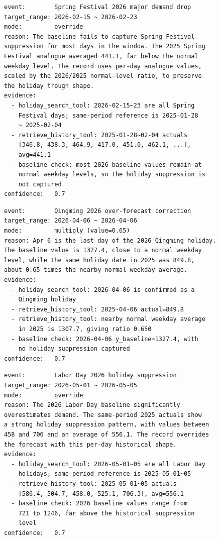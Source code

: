 \documentclass{article}
\theoremstyle{plain}
\theoremstyle{definition}
\theoremstyle{remark}
\begin{document}
\begin{lstlisting}[caption={Long-horizon revision: Spring Festival}, label={lst:case_study_6_3_spring_festival}]
event:        Spring Festival 2026 major demand drop
target_range: 2026-02-15 ~ 2026-02-23
mode:         override
reason: The baseline fails to capture Spring Festival
suppression for most days in the window. The 2025 Spring
Festival analogue averaged 441.1, far below the normal
weekday level. The record uses per-day analogue values,
scaled by the 2026/2025 normal-level ratio, to preserve
the holiday trough shape.
evidence:
  - holiday_search_tool: 2026-02-15~23 are all Spring
    Festival days; same-period reference is 2025-01-28
    ~ 2025-02-04
  - retrieve_history_tool: 2025-01-28~02-04 actuals
    [346.8, 438.3, 464.9, 417.0, 451.0, 462.1, ...],
    avg=441.1
  - baseline check: most 2026 baseline values remain at
    normal weekday levels, so the holiday suppression is
    not captured
confidence:   0.7
\end{lstlisting}

\begin{lstlisting}[caption={Long-horizon revision: Qingming}, label={lst:case_study_6_3_qingming}]
event:        Qingming 2026 over-forecast correction
target_range: 2026-04-06 ~ 2026-04-06
mode:         multiply (value=0.65)
reason: Apr 6 is the last day of the 2026 Qingming holiday.
The baseline value is 1327.4, close to a normal weekday
level, while the same holiday date in 2025 was 849.8,
about 0.65 times the nearby normal weekday average.
evidence:
  - holiday_search_tool: 2026-04-06 is confirmed as a
    Qingming holiday
  - retrieve_history_tool: 2025-04-06 actual=849.8
  - retrieve_history_tool: nearby normal weekday average
    in 2025 is 1307.7, giving ratio 0.650
  - baseline check: 2026-04-06 y_baseline=1327.4, with
    no holiday suppression captured
confidence:   0.7
\end{lstlisting}

\begin{lstlisting}[caption={Long-horizon revision: Labor Day}, label={lst:case_study_6_3_labor_day}]
event:        Labor Day 2026 holiday suppression
target_range: 2026-05-01 ~ 2026-05-05
mode:         override
reason: The 2026 Labor Day baseline significantly
overestimates demand. The same-period 2025 actuals show
a strong holiday suppression pattern, with values between
458 and 706 and an average of 556.1. The record overrides
the forecast with this per-day historical shape.
evidence:
  - holiday_search_tool: 2026-05-01~05 are all Labor Day
    holidays; same-period reference is 2025-05-01~05
  - retrieve_history_tool: 2025-05-01~05 actuals
    [586.4, 504.7, 458.0, 525.1, 706.3], avg=556.1
  - baseline check: 2026 baseline values range from
    721 to 1246, far above the historical suppression
    level
confidence:   0.7
\end{lstlisting}
\end{document}
